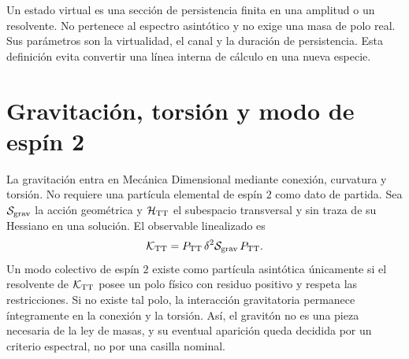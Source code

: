 Un estado virtual es una sección de persistencia finita en una amplitud o un
resolvente. No pertenece al espectro asintótico y no exige una masa de polo
real. Sus parámetros son la virtualidad, el canal y la duración de
persistencia. Esta definición evita convertir una línea interna de cálculo en
una nueva especie.

\section{Gravitación, torsión y modo de espín 2}

La gravitación entra en Mecánica Dimensional mediante conexión, curvatura y
torsión. No requiere una partícula elemental de espín \(2\) como dato de
partida. Sea \(\mathcal S_{\rm grav}\) la acción geométrica y
\(\mathcal H_{\rm TT}\) el subespacio transversal y sin traza de su Hessiano
en una solución. El observable linealizado es
\[
 \mathcal K_{\rm TT}
 =P_{\rm TT}\,\delta^2\mathcal S_{\rm grav}\,P_{\rm TT}.
\]
Un modo colectivo de espín \(2\) existe como partícula asintótica únicamente
si el resolvente de \(\mathcal K_{\rm TT}\) posee un polo físico con residuo
positivo y respeta las restricciones. Si no existe tal polo, la interacción
gravitatoria permanece íntegramente en la conexión y la torsión. Así, el
gravitón no es una pieza necesaria de la ley de masas, y su eventual aparición
queda decidida por un criterio espectral, no por una casilla nominal.
